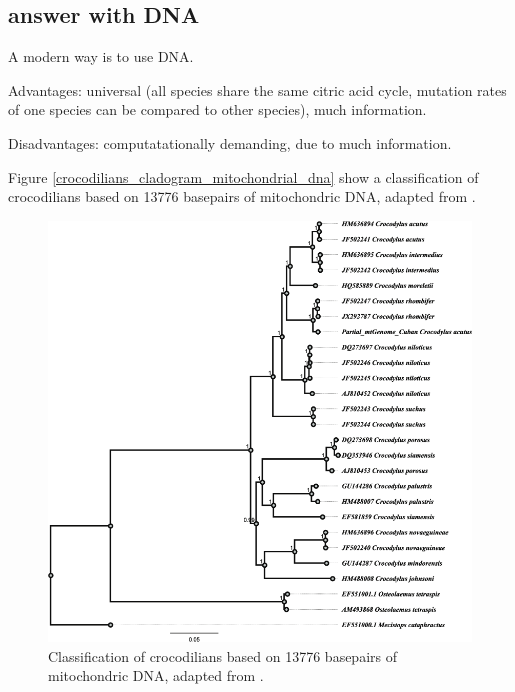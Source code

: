 \subsection{answer with DNA}

A modern way is to use DNA.

Advantages: universal (all species share the same citric acid cycle,
mutation rates of one species can be compared to other species),
much information.

Disadvantages: computatationally demanding, due to much information.

Figure \ref{crocodilians_cladogram_mitochondrial_dna}
show a classification of crocodilians based on 13776 basepairs of
mitochondric DNA, adapted from \cite{milian2018mitogenomic}.


\begin{figure}[H]
  \includegraphics[width=1.0\textwidth]{milian_garcia_2018.png}
  \caption{
    Classification of crocodilians based on 13776 basepairs of
    mitochondric DNA, adapted from \cite{milian2018mitogenomic}.
  }
  \label{fig:crocodilians_cladogram_mitochondrial_dna}
\end{figure}


